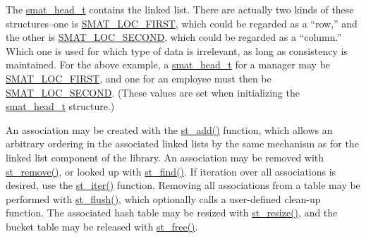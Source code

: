 The \hyperlink{group__dbprim__smat_a1}{smat\_\-head\_\-t} contains the linked list. There are actually two kinds of these structures--one is \hyperlink{group__dbprim__smat_a48a136}{SMAT\_\-LOC\_\-FIRST}, which could be regarded as a ``row,'' and the other is \hyperlink{group__dbprim__smat_a48a137}{SMAT\_\-LOC\_\-SECOND}, which could be regarded as a ``column.'' Which one is used for which type of data is irrelevant, as long as consistency is maintained. For the above example, a \hyperlink{group__dbprim__smat_a1}{smat\_\-head\_\-t} for a manager may be \hyperlink{group__dbprim__smat_a48a136}{SMAT\_\-LOC\_\-FIRST}, and one for an employee must then be \hyperlink{group__dbprim__smat_a48a137}{SMAT\_\-LOC\_\-SECOND}. (These values are set when initializing the \hyperlink{group__dbprim__smat_a1}{smat\_\-head\_\-t} structure.)

An association may be created with the \hyperlink{group__dbprim__smat_a10}{st\_\-add()} function, which allows an arbitrary ordering in the associated linked lists by the same mechanism as for the linked list component of the library. An association may be removed with \hyperlink{group__dbprim__smat_a11}{st\_\-remove()}, or looked up with \hyperlink{group__dbprim__smat_a12}{st\_\-find()}. If iteration over all associations is desired, use the \hyperlink{group__dbprim__smat_a13}{st\_\-iter()} function. Removing all associations from a table may be performed with \hyperlink{group__dbprim__smat_a14}{st\_\-flush()}, which optionally calls a user-defined clean-up function. The associated hash table may be resized with \hyperlink{group__dbprim__smat_a15}{st\_\-resize()}, and the bucket table may be released with \hyperlink{group__dbprim__smat_a16}{st\_\-free()}.


